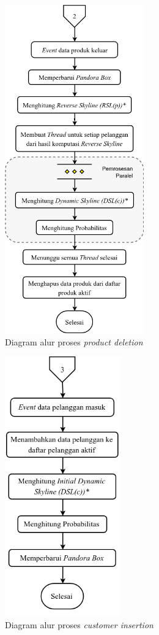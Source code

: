 \begin{figure}[H]
	\centering
	\includegraphics[width=6cm]{assets/img/bab3/flowchart-po.png}
	\caption{Diagram alur proses \textit{product deletion}}
	\label{fig:flowchart-po}
\end{figure}

\begin{figure}[H]
	\centering
	\includegraphics[width=5cm]{assets/img/bab3/flowchart-ci.png}
	\caption{Diagram alur proses \textit{customer insertion}}
	\label{fig:flowchart-ci}
\end{figure}

